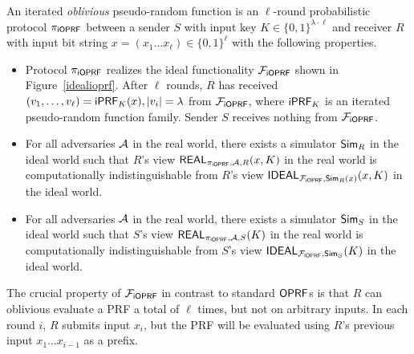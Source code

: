\begin{definition}[$\proto$]
  An iterated \emph{oblivious} pseudo-random function is an
  $\ell$-round probabilistic protocol $\proto$ between a sender $S$
  with input key $K\in\{0,1\}^{\lambda\cdot\ell}$ and receiver $R$
  with input bit string $x=(x_1\ldots{}x_\ell)\in\{0,1\}^{\ell}$ with
  the following properties.

  \begin{itemize}
   
  \item Protocol $\proto$ realizes the ideal functionality $\mathcal{F}_{\mathsf{i}\mathsf{OPRF}}$
    shown in Figure~\ref{idealioprf}. After $\ell$ rounds, $R$ has
    received $(v_1,\ldots,v_\ell)=\mathsf{i}\mathsf{PRF}_K(x),|v_i|=\lambda$ from
    $\mathcal{F}_{\mathsf{i}\mathsf{OPRF}}$, where $\mathsf{i}\mathsf{PRF}_K$ is an iterated pseudo-random function
    family. Sender $S$ receives nothing from $\mathcal{F}_{\mathsf{i}\mathsf{OPRF}}$.
  
  \item For all adversaries ${\mathcal{A}}$ in the real world, there exists a
    simulator ${\mathsf{Sim}}_R$ in the ideal world such that $R$'s view
    $\mathsf{REAL}_{{\pi_{\mathsf{i}\mathsf{OPRF}}},{\mathcal{A}},R}(x,K)$ in the real world is
    computationally indistinguishable from $R$'s view
    $\mathsf{IDEAL}_{\mathcal{F}_{\mathsf{i}\mathsf{OPRF}},{\mathsf{Sim}}_R(x)}(x,K)$ in the ideal world.

  \item For all adversaries ${\mathcal{A}}$ in the real world, there exists a
    simulator ${\mathsf{Sim}}_S$ in the ideal world such that $S$'s view
    $\mathsf{REAL}_{{\pi_{\mathsf{i}\mathsf{OPRF}}},{\mathcal{A}},S}(K)$ in the real world is
    computationally indistinguishable from $S$'s view
    $\mathsf{IDEAL}_{\mathcal{F}_{\mathsf{i}\mathsf{OPRF}},{\mathsf{Sim}}_S}(K)$ in the ideal world.
\end{itemize}
\end{definition}

The crucial property of $\mathcal{F}_{\mathsf{i}\mathsf{OPRF}}$ in contrast to standard $\mathsf{OPRF}$s is
that $R$ can oblivious evaluate a PRF a total of $\ell$ times, but not
on arbitrary inputs. In each round $i$, $R$ submits input $x_i$, but
the PRF will be evaluated using $R$'s previous input
$x_1\ldots{}x_{i-1}$ as a prefix.

